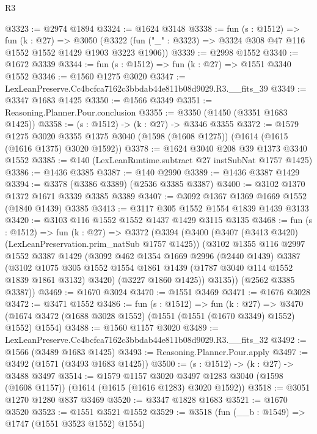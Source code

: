\begin{lexlean}{R3}
\begin{coremodule}
@3323 := @2974 @1894
@3324 := @1624 @3148
@3338 := fun (s : @1512) =>
  fun (k : @27) =>
  @3050 (@3322 (fun ("_" : @3323) => @3324 @308 @47 @116 @1552 @1552 @1429 @1903 @3223 @1906))
@3339 := @2998 @1552
@3340 := @1672 @3339
@3344 := fun (s : @1512) => fun (k : @27) => @1551 @3340 @1552
@3346 := @1560 @1275 @3020
@3347 := LexLeanPreserve.Cc4bcfca7162c3bbdab44e811b08d9029.R3.__fits_39
@3349 := @3347 @1683 @1425
@3350 := @1566 @3349
@3351 := Reasoning.Planner.Pour.conclusion
@3355 := @3350 (@1450 (@3351 @1683 @1425))
@3358 := (s : @1512) -> (k : @27) -> @3346 @3355
@3372 := @1579
    @1275
    @3020
    @3355
    @1375
    @3040
    (@1598 (@1608 @1275))
    (@1614 (@1615 (@1616 @1375) @3020 @1592))
@3378 := @1624 @3040 @208 @39 @1373 @3340 @1552
@3385 := @140 (LexLeanRuntime.subtract @27 instSubNat @1757 @1425)
@3386 := @1436 @3385
@3387 := @140 @2990
@3389 := @1436 @3387 @1429
@3394 := @3378 (@3386 @3389) (@2536 @3385 @3387)
@3400 := @3102 @1370 @1372 @1671 @3339 @3385 @3389
@3407 := @3092 @1367 @1369 @1669 @1552 (@1840 @1439) @3385
@3413 := @3117 @305 @1552 @1554 @1839 @1439 @3133
@3420 := @3103 @116 @1552 @1552 @1437 @1429 @3115 @3135
@3468 := fun (s : @1512) =>
  fun (k : @27) =>
  @3372
    (@3394
      (@3400
        (@3407 (@3413 @3420) (LexLeanPreservation.prim_natSub @1757 @1425))
        (@3102
          @1355
          @116
          @2997
          @1552
          @3387
          @1429
          (@3092
            @462
            @1354
            @1669
            @2996
            (@2440 @1439)
            @3387
            (@3102
              @1075
              @305
              @1552
              @1554
              @1861
              @1439
              (@1787 @3040 @114 @1552 @1839 @1861 @3132)
              @3420)
            (@3227 @1860 @1425))
          @3135))
      (@2562 @3385 @3387))
@3469 := @1670 @3024
@3470 := @1551 @3469
@3471 := @1676 @3028
@3472 := @3471 @1552
@3486 := fun (s : @1512) =>
  fun (k : @27) =>
  @3470 (@1674 @3472 (@1688 @3028 @1552) (@1551 (@1551 (@1670 @3349) @1552) @1552) @1554)
@3488 := @1560 @1157 @3020
@3489 := LexLeanPreserve.Cc4bcfca7162c3bbdab44e811b08d9029.R3.__fits_32
@3492 := @1566 (@3489 @1683 @1425)
@3493 := Reasoning.Planner.Pour.apply
@3497 := @3492 (@1571 (@3493 @1683 @1425))
@3500 := (s : @1512) -> (k : @27) -> @3488 @3497
@3514 := @1579
    @1157
    @3020
    @3497
    @1283
    @3040
    (@1598 (@1608 @1157))
    (@1614 (@1615 (@1616 @1283) @3020 @1592))
@3518 := @3051 @1270 @1280 @837 @3469
@3520 := @3347 @1828 @1683
@3521 := @1670 @3520
@3523 := @1551 @3521 @1552
@3529 := @3518 (fun (__b : @1549) => @1747 (@1551 @3523 @1552) @1554)

\end{coremodule}
\end{lexlean}
